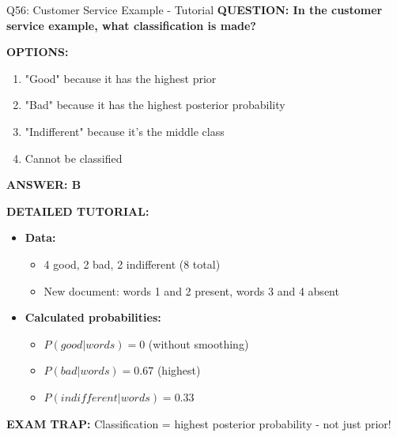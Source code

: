 \documentclass[8pt]{beamer}
\begin{document}
	\begin{frame}{Q56: Customer Service Example - Tutorial}
		\fontsize{6.5}{7.5}\selectfont
		\textbf{QUESTION: In the customer service example, what classification is made?}
		
		\vspace{0.1cm}
		\textbf{OPTIONS:}
		\begin{enumerate}
			\item "Good" because it has the highest prior
			\item "Bad" because it has the highest posterior probability
			\item "Indifferent" because it's the middle class
			\item Cannot be classified
		\end{enumerate}
		
		\vspace{0.1cm}
		\textcolor{myblue}{\textbf{ANSWER: B}}
		
		\vspace{0.1cm}
		\textbf{DETAILED TUTORIAL:}
		\begin{itemize}
			\item \textbf{Data:}
			\begin{itemize}
				\item 4 good, 2 bad, 2 indifferent (8 total)
				\item New document: words 1 and 2 present, words 3 and 4 absent
			\end{itemize}
			\item \textbf{Calculated probabilities:}
			\begin{itemize}
				\item $P(good|words) = 0$ (without smoothing)
				\item $P(bad|words) = 0.67$ (highest)
				\item $P(indifferent|words) = 0.33$
			\end{itemize}
		\end{itemize}
		
		\textcolor{myred}{\textbf{EXAM TRAP:}} Classification = \textcolor{myblue}{highest posterior probability} - not just prior!
	\end{frame}
	
\end{document}
